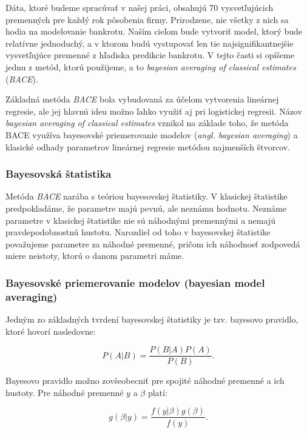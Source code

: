 Dáta, ktoré budeme spracúvať v našej práci, obsahujú 70 vysvetľujúcich premenných pre každý rok pôsobenia firmy.
Prirodzene, nie všetky z nich sa hodia na modelovanie bankrotu.
Naším cieľom bude vytvoriť model, ktorý bude relatívne jednoduchý, a v ktorom budú vystupovať len tie najsignifikantnejšie vysvetľujúce premenné z hľadiska predikcie bankrotu.
V tejto časti si opíšeme jednu z metód, ktorú použijeme, a to \emph{bayesian averaging of classical estimates} (\emph{BACE}).

Základná metóda \emph{BACE} bola vybudovaná za účelom vytvorenia lineárnej regresie, ale jej hlavnú ideu možno ľahko využiť aj pri logistickej regresii.
Názov \emph{bayesian averaging of classical estimates} vznikol na základe toho, že metóda BACE využíva bayesovské priemerovanie modelov (\emph{angl. bayesian averaging}) a klasické odhady parametrov lineárnej regresie metódou najmenších štvorcov.

\subsubsection{Bayesovská štatistika}

Metóda \emph{BACE} narába s teóriou bayesovskej štatistiky.
V klasickej štatistike predpokladáme, že parametre majú pevnú, ale neznámu hodnotu.
Neznáme parametre v klasickej štatistike nie sú náhodnými premennými a nemajú pravdepodobnostnú hustotu.
Narozdiel od toho v bayesovskej štatistike považujeme parametre za náhodné premenné, pričom ich náhodnosť zodpovedá miere neistoty, ktorú o danom parametri máme.

\subsubsection{Bayesovské priemerovanie modelov (bayesian model averaging)}

Jedným zo základných tvrdení bayesovskej štatistiky je tzv. bayesovo pravidlo, ktoré hovorí nasledovne:

\[
P(A|B) = \frac{P(B|A) P(A)}{P(B)}.
\]

Bayesovo pravidlo možno zovšeobecniť pre spojité náhodné premenné a ich hustoty. Pre náhodné premenné \(y\) a \( \beta \) platí:

\begin{equation} \label{bayes_rule}
    g(\beta | y) = \frac{f(y | \beta) g(\beta)}{f(y)}.
\end{equation}

